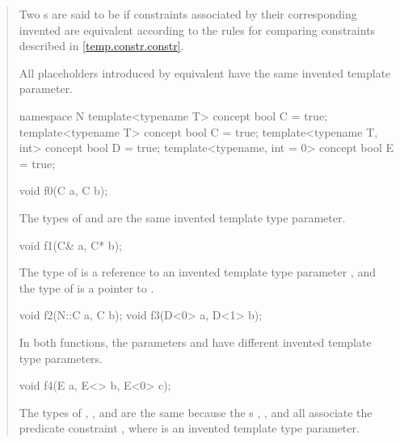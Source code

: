 \begin{quote}
\pnum
Two s are said to be 
 if constraints associated by their corresponding
invented  are
equivalent according to the rules for comparing constraints described in 
\ref{temp.constr.constr}.

\pnum
All placeholders introduced by equivalent 
have the same invented template parameter.
% 
\enterexample
\begin{codeblock}
namespace N {
  template<typename T> concept bool C = true;
}
template<typename T> concept bool C = true;
template<typename T, int> concept bool D = true;
template<typename, int = 0> concept bool E = true;

void f0(C a, C b);
\end{codeblock}
The types of  and  are the same invented template
type parameter.
% 
\begin{codeblock}
void f1(C& a, C* b);
\end{codeblock}
The type of  is a reference to an invented template type parameter 
, and the type of  is a pointer to .
% 
\begin{codeblock}
void f2(N::C a, C b);
void f3(D<0> a, D<1> b);
\end{codeblock}
In both functions, the parameters  and
 have different invented template type parameters.
% 
\begin{codeblock}
void f4(E a, E<> b, E<0> c);
\end{codeblock}
The types of , , and  are the same because the 
s , , and 
 all associate the predicate constraint , where 
 is an invented template type parameter.
\end{quote}

% 
% 

